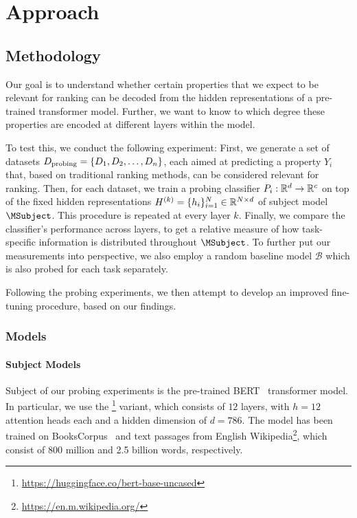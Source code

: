 \chapter{Approach}
\label{chap:approach}

\section{Methodology}
Our goal is to understand whether certain properties that we expect to be relevant for ranking can be decoded from the hidden representations of a pre-trained transformer model. Further, we want to know to which degree these properties are encoded at different layers within the model.

To test this, we conduct the following experiment: First, we generate a set of datasets $D_{\text{probing}}=\{D_1, D_2, \dots, D_n \}$, each aimed at predicting a property $Y_i$ that, based on traditional ranking methods, can be considered relevant for ranking. Then, for each dataset, we train a probing classifier $P_i: \mathbb{R}^d \rightarrow \mathbb{R}^c$ on top of the fixed hidden representations $H^{(k)} = \{h_i\}_{i=1}^N \in \mathbb{R}^{N \times d}$ of subject model $\MSubject$. This procedure is repeated at every layer $k$. Finally, we compare the classifier's performance  across layers, to get a relative measure of how task-specific information is distributed throughout $\MSubject$. To further put our measurements into perspective, we also employ a random baseline model $\mathcal{B}$ which is also probed for each task separately.

Following the probing experiments, we then attempt to develop an improved fine-tuning procedure, based on our findings.

\subsection{Models}
\subsubsection{Subject Models}
Subject of our probing experiments is the pre-trained BERT~\cite{devlin-etal-2019-bert} transformer model. In particular, we use the \footnote{\url{https://huggingface.co/bert-base-uncased}} variant, which consists of $12$ layers, with $h=12$ attention heads each and a hidden dimension of $d=786$. The model has been trained on BooksCorpus~\cite{7410368} and text passages from English Wikipedia\footnote{\url{https://en.m.wikipedia.org/}}, which consist of 800 million and 2.5 billion words, respectively.

